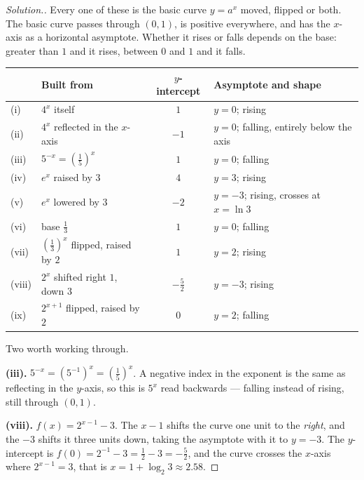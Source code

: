\documentclass[11pt,a4paper]{article}
\theoremstyle{definition}
\newenvironment{solution}
  {\renewcommand{\qedsymbol}{}\begin{proof}[\textit{Solution}.]}
  {\end{proof}}
\begin{document}
\begin{solution}
Every one of these is the basic curve $y=a^x$ moved, flipped or both. The basic curve
passes through $(0,1)$, is positive everywhere, and has the $x$-axis as a horizontal
asymptote. Whether it rises or falls depends on the base: greater than $1$ and it rises,
between $0$ and $1$ and it falls.

\begin{table}[H]
\centering
\begin{tabular}{|l|l|c|l|}
\hline
 & Built from & $y$-intercept & Asymptote and shape\\
\hline
(i) & $4^x$ itself & $1$ & $y=0$; rising\\
(ii) & $4^x$ reflected in the $x$-axis & $-1$ & $y=0$; falling, entirely below the axis\\
(iii) & $5^{-x}=\left(\frac{1}{5}\right)^x$ & $1$ & $y=0$; falling\\
(iv) & $e^x$ raised by $3$ & $4$ & $y=3$; rising\\
(v) & $e^x$ lowered by $3$ & $-2$ & $y=-3$; rising, crosses at $x=\ln 3$\\
(vi) & base $\frac{1}{3}$ & $1$ & $y=0$; falling\\
(vii) & $\left(\frac{1}{3}\right)^x$ flipped, raised by $2$ & $1$ & $y=2$; rising\\
(viii) & $2^x$ shifted right $1$, down $3$ & $-\frac{5}{2}$ & $y=-3$; rising\\
(ix) & $2^{x+1}$ flipped, raised by $2$ & $0$ & $y=2$; falling\\
\hline
\end{tabular}
\end{table}

Two worth working through.

\textbf{(iii).} $5^{-x}=\left(5^{-1}\right)^x=\left(\frac{1}{5}\right)^x$. A negative
index in the exponent is the same as reflecting in the $y$-axis, so this is $5^x$ read
backwards --- falling instead of rising, still through $(0,1)$.

\textbf{(viii).} $f(x)=2^{x-1}-3$. The $x-1$ shifts the curve one unit to the
\emph{right}, and the $-3$ shifts it three units down, taking the asymptote with it to
$y=-3$. The $y$-intercept is $f(0)=2^{-1}-3=\frac{1}{2}-3=-\frac{5}{2}$, and the curve
crosses the $x$-axis where $2^{x-1}=3$, that is $x=1+\log_2 3\approx 2.58$.


\end{solution}
\end{document}
